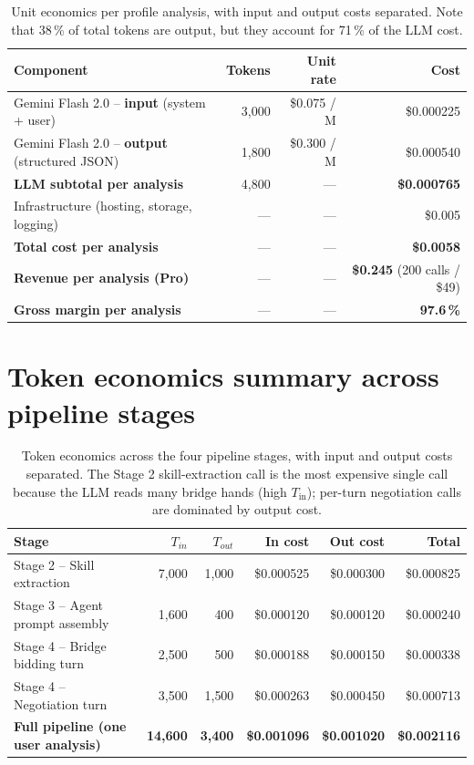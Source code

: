 \documentclass[11pt, a4paper, oneside]{report}
\begin{document}
\begin{table}[H]
\centering\small
\caption{Unit economics per profile analysis, with input and output costs separated.
Note that 38\,\% of total tokens are output, but they account for 71\,\% of the LLM cost.}
\label{tab:unit_econ}
\begin{tabular}{l r r r}
\toprule
\textbf{Component} & \textbf{Tokens} & \textbf{Unit rate} & \textbf{Cost} \\
\midrule
Gemini Flash 2.0 -- \textbf{input}  (system + user) & 3{,}000 & \$0.075 / M & \$0.000225 \\
Gemini Flash 2.0 -- \textbf{output} (structured JSON) & 1{,}800 & \$0.300 / M & \$0.000540 \\
\midrule
\textbf{LLM subtotal per analysis} & 4{,}800 & --- & \textbf{\$0.000765} \\
Infrastructure (hosting, storage, logging) & --- & --- & \$0.005 \\
\midrule
\textbf{Total cost per analysis}     & --- & --- & \textbf{\$0.0058} \\
\textbf{Revenue per analysis (Pro)}  & --- & --- & \textbf{\$0.245} (200 calls / \$49) \\
\textbf{Gross margin per analysis}   & --- & --- & \textbf{97.6\,\%} \\
\bottomrule
\end{tabular}
\end{table}

\section{Token economics summary across pipeline stages}

\begin{table}[H]
\centering\small
\caption{Token economics across the four pipeline stages, with input
and output costs separated. The Stage 2 skill-extraction call is
the most expensive single call because the LLM reads many bridge
hands (high $T_{\text{in}}$); per-turn negotiation calls are dominated
by output cost.}
\label{tab:token_econ_full}
\begin{tabularx}{\textwidth}{X r r r r r}
\toprule
\textbf{Stage} & \textbf{$T_{in}$} & \textbf{$T_{out}$}
               & \textbf{In cost} & \textbf{Out cost} & \textbf{Total} \\
\midrule
Stage 2 -- Skill extraction       & 7{,}000 & 1{,}000 & \$0.000525 & \$0.000300 & \$0.000825 \\
Stage 3 -- Agent prompt assembly  & 1{,}600 &   400   & \$0.000120 & \$0.000120 & \$0.000240 \\
Stage 4 -- Bridge bidding turn    & 2{,}500 &   500   & \$0.000188 & \$0.000150 & \$0.000338 \\
Stage 4 -- Negotiation turn       & 3{,}500 & 1{,}500 & \$0.000263 & \$0.000450 & \$0.000713 \\
\midrule
\textbf{Full pipeline (one user analysis)} & \textbf{14{,}600} & \textbf{3{,}400} & \textbf{\$0.001096} & \textbf{\$0.001020} & \textbf{\$0.002116} \\
\bottomrule
\end{tabularx}
\end{table}
\end{document}
